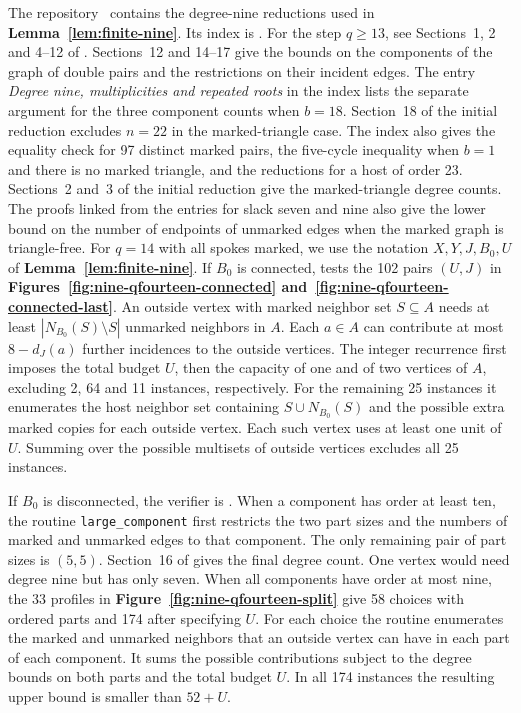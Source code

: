 The repository~\cite{FGSTCode} contains the degree-nine reductions
used in \textbf{Lemma~\ref{lem:finite-nine}}. Its index is
. For the step $q\geq13$, see
Sections~1, 2 and 4--12 of .
Sections~12 and 14--17 give the bounds on the components of the
graph of double pairs and the restrictions on their incident edges.
The entry \emph{Degree nine, multiplicities and repeated roots} in
the index lists the separate argument for the three component
counts when $b=18$. Section~18 of the initial reduction excludes
$n=22$ in the marked-triangle case.
The index also gives the equality check for 97 distinct marked
pairs, the five-cycle inequality when $b=1$ and there is no marked
triangle, and the reductions for a host of order 23. Sections~2
and~3 of the initial reduction give the marked-triangle degree counts.
The proofs linked from the entries for slack seven and nine also
give the lower bound on the number of endpoints of unmarked edges
when the marked graph is triangle-free.
For $q=14$ with all spokes marked, we use the notation $X,Y,J,B_0,U$
of \textbf{Lemma~\ref{lem:finite-nine}}. If $B_0$ is connected,
 tests the 102 pairs $(U,J)$ in
\textbf{Figures~\ref{fig:nine-qfourteen-connected}
and~\ref{fig:nine-qfourteen-connected-last}}. An outside vertex with
marked neighbor set $S\subseteq A$ needs at least
$|N_{B_0}(S)\setminus S|$ unmarked neighbors in $A$. Each $a\in A$
can contribute at most $8-d_J(a)$ further incidences to the outside
vertices. The integer recurrence first imposes the total budget $U$,
then the capacity of one and of two vertices of $A$, excluding
2, 64 and 11 instances, respectively. For the remaining 25 instances
it enumerates the host neighbor set containing $S\cup N_{B_0}(S)$
and the possible extra marked copies for each outside vertex.
Each such vertex uses at least one unit of $U$.
Summing over the possible multisets of outside vertices excludes
all 25 instances.

If $B_0$ is disconnected, the verifier is
. When a component has order at least
ten, the routine \texttt{large\_component} first restricts the two
part sizes and the numbers of marked and unmarked edges to that
component. The only remaining pair of part sizes is $(5,5)$.
Section~16 of  gives the final
degree count. One vertex would need degree nine but has only seven.
When all components have order at most nine, the 33 profiles in
\textbf{Figure~\ref{fig:nine-qfourteen-split}} give 58 choices with
ordered parts and 174 after specifying $U$. For each choice the
routine enumerates the marked and unmarked neighbors that an outside
vertex can have in each part of each component. It sums the possible
contributions subject to the degree bounds on both parts and the
total budget $U$. In all 174 instances the resulting upper bound
is smaller than $52+U$.

